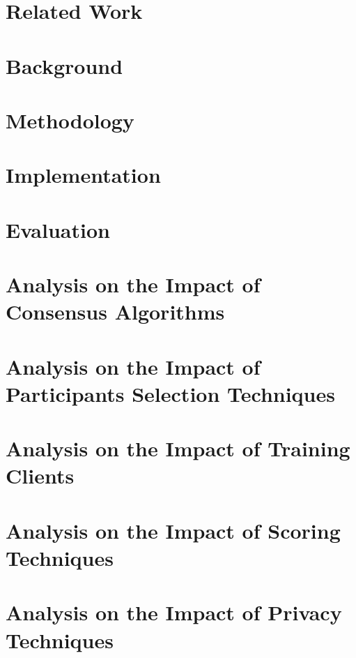 \documentclass[12pt,a4paper,oneside]{book}
\begin{document}
\chapter{Related Work}\label{chapter:related_work}


\chapter{Background}\label{chapter:background}


\chapter{Methodology}\label{chapter:methodology}


\chapter{Implementation}\label{chapter:implementation}


\chapter{Evaluation}\label{chapter:evaluation}


\chapter{Analysis on the Impact of Consensus Algorithms}\label{analysis:consensus_algorithms}


\chapter{Analysis on the Impact of Participants Selection Techniques}\label{analysis:participants}


\chapter{Analysis on the Impact of Training Clients}\label{analysis:clients}

\chapter{Analysis on the Impact of Scoring Techniques}\label{analysis:scoring}


\chapter{Analysis on the Impact of Privacy Techniques}\label{analysis:privacy}
\end{document}
